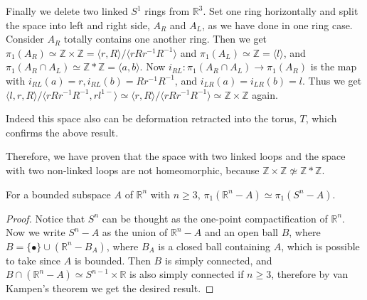 \begin{exmp} Finally we delete two linked $S^1$ rings from $\mathbb{R}^3$. Set one ring horizontally and split the space into left and right side, $A_R$ and $A_L$, as we have done in one ring case. Consider $A_R$ totally contains one another ring. Then we get $\pi_1(A_R)\simeq \mathbb{Z}\times \mathbb{Z}=\langle r,R\rangle/\langle rRr^{-1}R^{-1}\rangle$ and $\pi_1(A_L)\simeq \mathbb{Z}=\langle l\rangle$, and $\pi_1(A_R\cap A_L)\simeq \mathbb{Z}*\mathbb{Z}=\langle a,b\rangle$. Now $i_{RL}:\pi_1(A_R\cap A_L)\rightarrow \pi_1(A_R)$ is the map with $i_{RL}(a)=r, i_{RL}(b)=Rr^{-1}R^{-1}$, and $i_{LR}(a)=i_{LR}(b)=l$. Thus we get $\langle l,r,R\rangle/\langle rRr^{-1}R^{-1}, rl^{1-}\rangle\simeq \langle r,R\rangle/\langle rRr^{-1}R^{-1}\rangle\simeq \mathbb{Z}\times \mathbb{Z}$ again.

Indeed this space also can be deformation retracted into the torus, $T$, which confirms the above result.

Therefore, we have proven that the space with two linked loops and the space with two non-linked loops are not homeomorphic, because $\mathbb{Z}\times \mathbb{Z}\not\simeq \mathbb{Z}*\mathbb{Z}$.
\end{exmp}

\begin{lemma} For a bounded subspace $A$ of $\mathbb{R}^n$ with $n\geq 3$, $\pi_1(\mathbb{R}^n-A)\simeq \pi_1(S^n-A).$
\end{lemma}
\begin{proof}
Notice that $S^n$ can be thought as the one-point compactification of $\mathbb{R}^n$. Now we write $S^n-A$ as the union of $\mathbb{R}^n-A$ and an open ball $B$, where $B=\{\bullet\}\cup (\mathbb{R}^n-B_A)$, where $B_A$ is a closed ball containing $A$, which is possible to take since $A$ is bounded. Then $B$ is simply connected, and $B\cap (\mathbb{R}^n-A)\simeq S^{n-1}\times \mathbb{R}$ is also simply connected if $n\geq 3$, therefore by van Kampen's theorem we get the desired result.
\end{proof}

